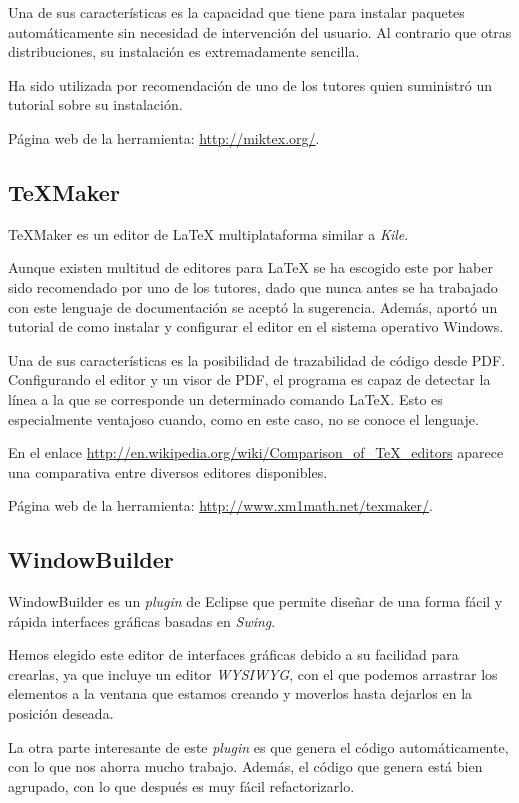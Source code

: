 Una de sus características es la capacidad que tiene para instalar paquetes automáticamente sin necesidad de intervención del usuario. Al contrario que otras distribuciones, su instalación es extremadamente sencilla.

Ha sido utilizada por recomendación de uno de los tutores quien suministró un tutorial sobre su instalación.

Página web de la herramienta: \url{http://miktex.org/}.


\subsection{\TeX{}Maker}
\TeX{}Maker es un editor de \LaTeX{} multiplataforma similar a \textit{Kile}.

Aunque existen multitud de editores para \LaTeX{} se ha escogido este por haber sido recomendado por uno de los tutores, dado que nunca antes se ha trabajado con este lenguaje de documentación se aceptó la sugerencia. Además, aportó un tutorial de como instalar y configurar el editor en el sistema operativo Windows.

Una de sus características es la posibilidad de trazabilidad de código desde PDF. Configurando el editor y un visor de PDF, el programa es capaz de detectar la línea a la que se corresponde un determinado comando \LaTeX{}. Esto es especialmente ventajoso cuando, como en este caso, no se conoce el lenguaje.

En el enlace \url{http://en.wikipedia.org/wiki/Comparison_of_TeX_editors} aparece una comparativa entre diversos editores disponibles.

Página web de la herramienta: \url{http://www.xm1math.net/texmaker/}.

\subsection{WindowBuilder}
WindowBuilder es un \textit{plugin} de Eclipse que permite diseñar de una forma fácil y rápida interfaces gráficas basadas en \textit{Swing}.

Hemos elegido este editor de interfaces gráficas debido a su facilidad para crearlas, ya que incluye un editor \textit{WYSIWYG}, con el que podemos arrastrar los elementos a la ventana que estamos creando y moverlos hasta dejarlos en la posición deseada.

La otra parte interesante de este \textit{plugin} es que genera el código automáticamente, con lo que nos ahorra mucho trabajo. Además, el código que genera está bien agrupado, con lo que después es muy fácil refactorizarlo.

